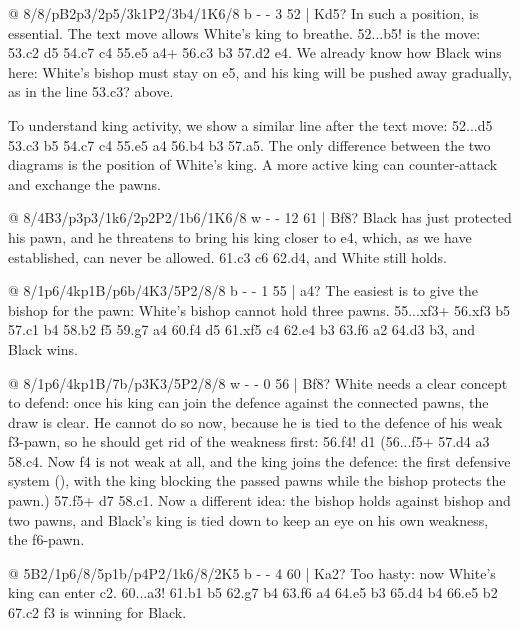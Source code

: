 @ 8/8/pB2p3/2p5/3k1P2/3b4/1K6/8 b - - 3 52 | Kd5?
In such a position,  is essential.
The text move allows White's king to breathe. 52...\B b5! is the move: 53.\K c2 \K d5 54.\B c7 c4
55.\B e5 \B a4+ 56.\K c3 \B b3 57.\K d2 \K e4. We already know how Black wins here: White's bishop
must stay on e5, and his king will be pushed away gradually, as in the line 53.\K c3? above.

To understand king activity, we show a similar line after the text move: 52...\K d5 53.\K c3 \B b5
54.\B c7 c4
55.\B e5 \B a4 56.\K b4 \B b3 57.\K a5. The only difference between the two diagrams is the
position of White's king. A more active king can counter-attack and exchange the pawns.

@ 8/4B3/p3p3/1k6/2p2P2/1b6/1K6/8 w - - 12 61 | Bf8?
Black has just protected his pawn, and he threatens to bring his king closer to e4, which, as we
have established, can never be allowed. 61.\K c3 \K c6 62.\K d4, and White still holds.

@ 8/1p6/4kp1B/p6b/4K3/5P2/8/8 b - - 1 55 | a4?
The easiest is to give the bishop for the pawn: White's bishop cannot hold three pawns. 55...\B xf3+ 56.\K xf3 b5 57.\B c1 b4 58.\B b2 f5 59.\B g7 a4 60.\K f4 \K d5 61.\K xf5 \K c4 62.\K e4 \K b3 63.\B f6 \K a2 64.\K d3 b3, and Black wins.

@ 8/1p6/4kp1B/7b/p3K3/5P2/8/8 w - - 0 56 | Bf8?
White needs a clear concept to defend: once his king can join the defence against the connected pawns, the draw is clear. He cannot do so now, because he is tied to the defence of his weak f3-pawn, so he should get rid of the weakness first: 56.f4! \B d1 (56...f5+ 57.\K d4 a3 58.\K c4. Now f4 is not weak at all, and the king joins the defence: the first defensive system (), with the king blocking the passed pawns while the bishop protects the pawn.) 57.f5+ \K d7 58.\B c1. Now a different idea: the bishop holds against bishop and two pawns, and Black's king is tied down to keep an eye on his own weakness, the f6-pawn.

@ 5B2/1p6/8/5p1b/p4P2/1k6/8/2K5 b - - 4 60 | Ka2?
Too hasty: now White's king can enter c2. 60...a3! 61.\K b1 b5 62.\B g7 b4 63.\B f6 \K a4 64.\B e5 b3 65.\B d4 \K b4 66.\B e5 b2 67.\K c2 \B f3 is winning for Black.

